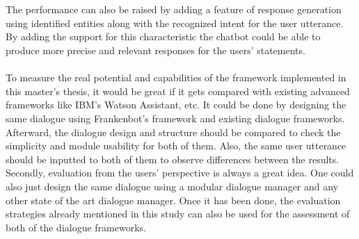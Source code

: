 \\~\\
The performance can also be raised by adding a feature of response generation using identified entities along with the recognized intent for the user utterance. By adding the support for this characteristic the chatbot could be able to produce more precise and relevant responses for the users' statements.
\\~\\
To measure the real potential and capabilities of the framework implemented in this master's thesis, it would be great if it gets compared with existing advanced frameworks like IBM's Watson Assistant, etc. It could be done by designing the same dialogue using Frankenbot's framework and existing dialogue frameworks. Afterward, the dialogue design and structure should be compared to check the simplicity and module usability for both of them. Also, the same user utterance should be inputted to both of them to observe differences between the results. Secondly, evaluation from the users' perspective is always a great idea. One could also just design the same dialogue using a modular dialogue manager and any other state of the art dialogue manager. Once it has been done, the evaluation strategies already mentioned in this study can also be used for the assessment of both of the dialogue frameworks.
